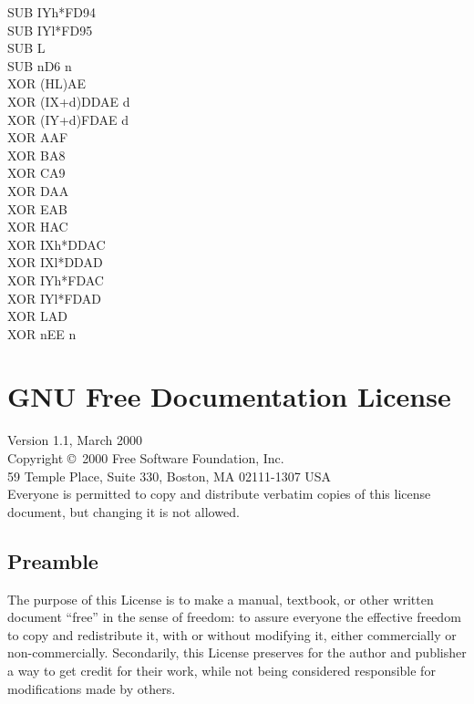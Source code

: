 \documentclass[oneside,a4paper]{book}
\begin{document}
\begin{multicols}{3}
{\begin{tabbing}
SUB IYh*\>FD94\\
SUB IYl*\>FD95\\
SUB L\\
SUB n\>D6 n\\
XOR (HL)\>AE\\
XOR (IX+d)\>DDAE d\\
XOR (IY+d)\>FDAE d\\
XOR A\>AF\\
XOR B\>A8\\
XOR C\>A9\\
XOR D\>AA\\
XOR E\>AB\\
XOR H\>AC\\
XOR IXh*\>DDAC\\
XOR IXl*\>DDAD\\
XOR IYh*\>FDAC\\
XOR IYl*\>FDAD\\
XOR L\>AD\\
XOR n\>EE n

\end{tabbing}
}
\end{multicols}
\normalsize

\chapter{GNU Free Documentation License}
\label{gfdl}

Version 1.1, March 2000\\

 Copyright \copyright\ 2000  Free Software Foundation, Inc.\\
     59 Temple Place, Suite 330, Boston, MA  02111-1307  USA\\
 Everyone is permitted to copy and distribute verbatim copies
 of this license document, but changing it is not allowed.

\section*{Preamble}

The purpose of this License is to make a manual, textbook, or other
written document ``free'' in the sense of freedom: to assure everyone
the effective freedom to copy and redistribute it, with or without
modifying it, either commercially or non-commercially.  Secondarily,
this License preserves for the author and publisher a way to get
credit for their work, while not being considered responsible for
modifications made by others.
\end{document}
